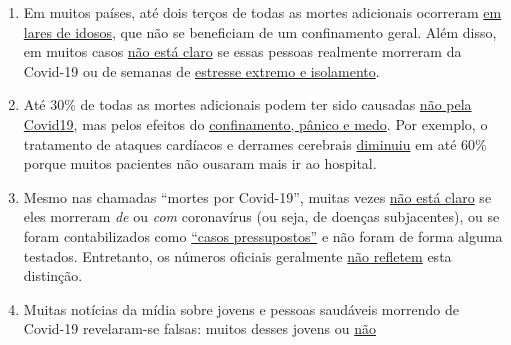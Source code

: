 \begin{enumerate}
{  cerca de 4\%} dos falecidos não tinham graves condições prévias. A
  idade e o perfil de risco dos falecidos corresponde, portanto,
  essencialmente à
  \href{https://www.vienna.at/analyse-zeigt-covid-19-opferkurve-entspricht-normaler-mortalitaet/6581246}{mortalidade
  usual}.
\item
  Em muitos países, até dois terços de todas as mortes adicionais
  ocorreram
  \href{https://swprs.org/studies-on-covid-19-lethality/\#care-homes}{em
  lares de idosos}, que não se beneficiam de um confinamento geral. Além
  disso, em muitos casos
  \href{https://www.hsj.co.uk/commissioning/thousands-of-extra-deaths-outside-hospital-not-attributed-to-covid-19/7027459.article}{não
  está claro} se essas pessoas realmente morreram da Covid-19 ou de
  semanas de
  \href{https://www.theguardian.com/world/2020/jun/05/covid-19-causing-10000-dementia-deaths-beyond-infections-research-says}{estresse
  extremo e isolamento}.
\item
  Até 30\% de todas as mortes adicionais podem ter sido causadas
  \href{https://www.ons.gov.uk/peoplepopulationandcommunity/birthsdeathsandmarriages/deaths/articles/analysisofdeathregistrationsnotinvolvingcoronaviruscovid19englandandwales28december2019to1may2020/technicalannex}{não
  pela Covid19}, mas pelos efeitos do
  \href{https://www.telegraph.co.uk/global-health/science-and-disease/two-new-waves-deaths-break-nhs-new-analysis-warns/}{confinamento,
  pânico e medo}. Por exemplo, o tratamento de ataques cardíacos e
  derrames cerebrais
  \href{https://www.nytimes.com/2020/04/06/well/live/coronavirus-doctors-hospitals-emergency-care-heart-attack-stroke.html}{diminuiu}
  em até 60\% porque muitos pacientes não ousaram mais ir ao hospital.
\item
  Mesmo nas chamadas ``mortes por Covid-19'', muitas vezes
  \href{https://spectator.us/understand-report-figures-covid-deaths/}{não
  está claro} se eles morreram \emph{de} ou \emph{com} coronavírus (ou
  seja, de doenças subjacentes), ou se foram contabilizados como
  \href{https://www.youtube.com/watch?v=V0lIWZpiRU0}{``casos
  pressupostos''} e não foram de forma alguma testados. Entretanto, os
  números oficiais geralmente
  \href{https://www.hsj.co.uk/coronavirus/systematic-reviews-to-discover-true-cause-of-outbreak-deaths/7027491.article}{não
  refletem} esta distinção.
\item
  Muitas notícias da mídia sobre jovens e pessoas saudáveis morrendo de
  Covid-19 revelaram-se falsas: muitos desses jovens ou
  \href{https://www.dailymail.co.uk/news/article-8193487/Coroner-refuses-rule-COVID-19-cause-death-six-week-old-Connecticut-baby.html}{não
}
\end{enumerate}
